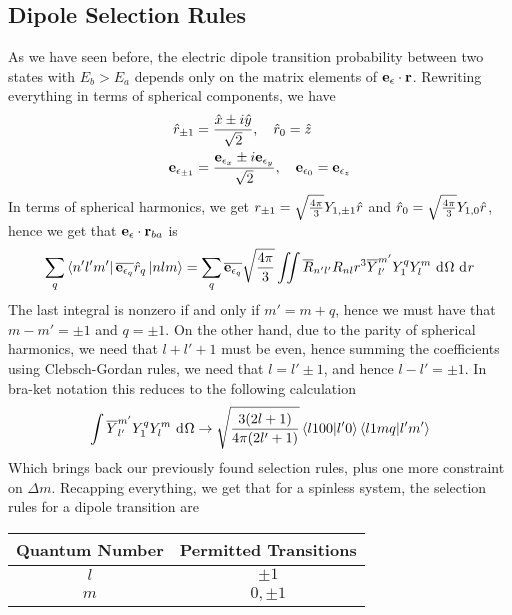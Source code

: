 \documentclass[../qm.tex]{subfiles}
\begin{document}
	\subsection{Dipole Selection Rules}
	As we have seen before, the electric dipole transition probability between two states with $E_b>E_a$ depends only on the matrix elements of $\mathbf{e}_{\epsilon}\cdot\mathbf{r}$. Rewriting everything in terms of spherical components, we have
	\begin{equation}
		\begin{aligned}
			\hat{r}_{\pm1}&=\frac{\hat{x}\pm i\hat{y}}{\sqrt{2}},\quad\hat{r}_0=\hat{z}\\
			\mathbf{e}_{\epsilon_{\pm1}}&=\frac{\mathbf{e}_{\epsilon_x}\pm i\mathbf{e}_{\epsilon_y}}{\sqrt{2}},\quad\mathbf{e}_{\epsilon_0}=\mathbf{e}_{\epsilon_z}
		\end{aligned}
		\label{eq:sphcoord}
	\end{equation}
	In terms of spherical harmonics, we get $r_{\pm1}=\sqrt{\frac{4\pi}{3}}Y_{1,\pm1}\hat{r}$ and $\hat{r}_0=\sqrt{\frac{4\pi}{3}}Y_{1,0}\hat{r}$, hence we get that $\mathbf{e}_{\epsilon}\cdot\mathbf{r}_{ba}$ is
	\begin{equation}
		\sum_q\bra{n'l'm'}\overline{\mathbf{e}_{\epsilon_q}}\hat{r}_q\ket{nlm}=\sum_q\overline{\mathbf{e}_{\epsilon_q}}\sqrt{\frac{4\pi}{3}}\iint\overline{R}_{n'l'}R_{nl}r^3\overline{Y}^{m'}_{l'}Y_{1}^qY^m_l\ \mathrm{d}^{}\Omega\ \mathrm{d}^{}r
		\label{eq:selrulesdippolarization}
	\end{equation}
	The last integral is nonzero if and only if $m'=m+q$, hence we must have that $m-m'=\pm1$ and $q=\pm1$. On the other hand, due to the parity of spherical harmonics, we need that $l+l'+1$ must be even, hence summing the coefficients using Clebsch-Gordan rules, we need that $l=l'\pm1$, and hence $l-l'=\pm1$. In bra-ket notation this reduces to the following calculation
	\begin{equation}
		\int\overline{Y}_{l'}^{m'}Y^q_1Y^m_l\ \mathrm{d}^{}\Omega\to\sqrt{\frac{3(2l+1)}{4\pi(2l'+1)}}\bra{l100}\ket{l'0}\bra{l1mq}\ket{l'm'}
		\label{eq:cgtableselrule}
	\end{equation}
	Which brings back our previously found selection rules, plus one more constraint on $\Delta m$. Recapping everything, we get that for a spinless system, the selection rules for a dipole transition are
	\begin{table}[H]
		\centering
		\begin{tabular}{|c|c|}
			\hline
			Quantum Number&Permitted Transitions\\
			\hline
			$l$&$\pm1$\\
			\hline
			$m$&$0,\pm1$\\
			\hline
		\end{tabular}
		\label{tab:selectionrulesspinless}
	\end{table}
\end{document}
